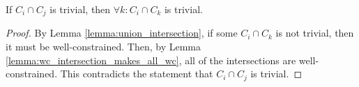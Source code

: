 \begin{lemma}\label{lemma:uc_intersection_makes_all_uc}
If $C_i\cap C_j$ is trivial, then $\forall k: C_i\cap C_k$ is trivial.
\end{lemma}

\begin{proof}
By Lemma \ref{lemma:union_intersection}, if some $C_i\cap C_k$ is not trivial, then it must be well-constrained. Then, by Lemma \ref{lemma:wc_intersection_makes_all_wc}, all of the intersections are well-constrained. This contradicts the statement that $C_i\cap C_j$ is trivial.
\end{proof}











